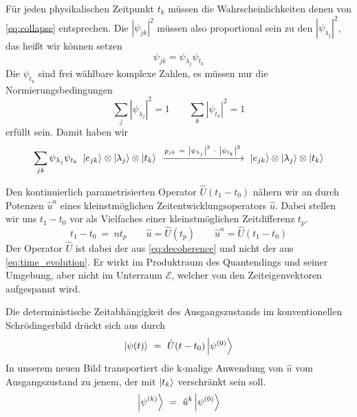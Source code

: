 \documentclass[12pt]{article}
\begin{document}
Für jeden physikalischen Zeitpunkt $t_k$ müssen die Wahrscheinlichkeiten denen von \eqref{eq:collapse} entsprechen. Die $\left|\psi_{jk}\right|^2$ müssen also proportional sein zu den $\left|\psi_{\lambda_j}\right|^2$, das heißt wir können setzen
\begin{equation*}
\psi_{jk} =  \psi_{\lambda_j} \psi_{t_k}
\end{equation*}
Die $\psi_{t_k}$ sind frei wählbare komplexe Zahlen, es müssen nur die Normierungsbedingungen
\begin{equation*}
\sum_j \left|\psi_{\lambda_j}\right|^2 = 1 \quad\quad
\sum_{k} \left|\psi_{t_k}\right|^2 = 1
\end{equation*}
erfüllt sein. Damit haben wir 
\begin{equation} 
\label{eq:collapse_with_time}
\sum_{jk} \psi_{\lambda_j}\psi_{t_k} \ \ket{e_{jk}} \otimes \ket{\lambda_j} \otimes \ket{t_k} 
\ \xrightarrow{p_{jk}\ =\ \left|\psi_{\lambda_j}\right|^2\ \cdot\ \left|\psi_{t_k}\right|^2}\ 
\ket{e_{jk}} \otimes \ket{\lambda_j} \otimes \ket{t_k}
\end{equation}

Den kontinuierlich parametrisierten Operator $\hat{U}(t_1-t_0)$ nähern wir an durch Potenzen $\hat{u}^n$ eines kleinstmöglichen Zeitentwicklungsoperators $\hat{u}$. Dabei stellen wir uns $t_1-t_0$ vor als Vielfaches einer kleinstmöglichen Zeitdifferenz $t_p$.
\begin{equation*}
t_1-t_0\ =\ n t_p \quad\quad 
\hat{u} = \hat{U}(t_p) \quad\quad 
\hat{u}^n = \hat{U}(t_1-t_0)
\end{equation*}
Der Operator $\hat{U}$ ist dabei der aus \eqref{eq:decoherence} und nicht der aus \eqref{eq:time_evolution}. Er wirkt im Produktraum des Quantendings und seiner Umgebung, aber nicht im Unterraum $\mathscr{E}$, welcher von den Zeiteigenvektoren aufgespannt wird.

Die deterministische Zeitabhängigkeit des Ausgangszustands im konventionellen Schrödingerbild drückt sich aus durch
\begin{equation*}
\ket{\psi(t)}\ =\ \hat{U}(t-t_0)\ket{\psi^{(0)}}
\end{equation*} 
In unserem neuen Bild transportiert die k-malige Anwendung von $\hat{u}$ vom Ausgangszustand zu jenem, der mit $\ket{t_k}$ verschränkt sein soll.
\begin{equation*}
\ket{\psi^{(k)}}\ =\ \hat{u}^k \ket{\psi^{(0)}}
\end{equation*} 
\end{document}
